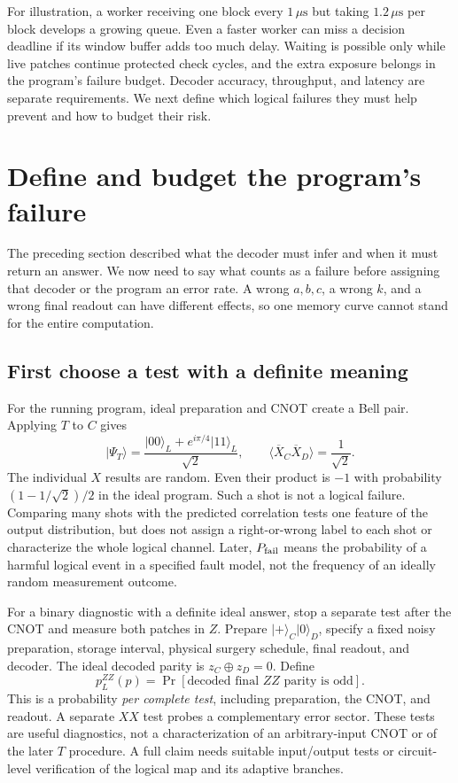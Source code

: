 \documentclass[11pt,a4paper]{article}
\newcommand{\ket}[1]{\lvert #1\rangle}
\newcommand{\XL}{\overline X}
\begin{document}
For illustration, a worker receiving one block every $1\,\mu\mathrm{s}$ but taking $1.2\,\mu\mathrm{s}$ per block develops a growing queue. Even a faster worker can miss a decision deadline if its window buffer adds too much delay. Waiting is possible only while live patches continue protected check cycles, and the extra exposure belongs in the program's failure budget. Decoder accuracy, throughput, and latency are separate requirements. We next define which logical failures they must help prevent and how to budget their risk.

\section{Define and budget the program's failure}\label{sec:budget}
The preceding section described what the decoder must infer and when it must return an answer. We now need to say what counts as a failure before assigning that decoder or the program an error rate. A wrong $a,b,c$, a wrong $k$, and a wrong final readout can have different effects, so one memory curve cannot stand for the entire computation.

\subsection{First choose a test with a definite meaning}
For the running program, ideal preparation and CNOT create a Bell pair. Applying $T$ to $C$ gives
\[
\ket{\Psi_T}=\frac{\ket{00}_L+e^{i\pi/4}\ket{11}_L}{\sqrt2},
\qquad \langle\XL_C\XL_D\rangle=\frac1{\sqrt2}.
\]
The individual $X$ results are random. Even their product is $-1$ with probability $(1-1/\sqrt2)/2$ in the ideal program. Such a shot is not a logical failure. Comparing many shots with the predicted correlation tests one feature of the output distribution, but does not assign a right-or-wrong label to each shot or characterize the whole logical channel. Later, $P_{\rm fail}$ means the probability of a harmful logical event in a specified fault model, not the frequency of an ideally random measurement outcome.

For a binary diagnostic with a definite ideal answer, stop a separate test after the CNOT and measure both patches in $Z$. Prepare $\ket+_C\ket0_D$, specify a fixed noisy preparation, storage interval, physical surgery schedule, final readout, and decoder. The ideal decoded parity is $z_C\oplus z_D=0$. Define
\begin{equation}\label{eq:pL}
p_L^{ZZ}(p)=\Pr[\text{decoded final }ZZ\text{ parity is odd}].
\end{equation}
This is a probability \emph{per complete test}, including preparation, the CNOT, and readout. A separate $XX$ test probes a complementary error sector. These tests are useful diagnostics, not a characterization of an arbitrary-input CNOT or of the later $T$ procedure. A full claim needs suitable input/output tests or circuit-level verification of the logical map and its adaptive branches.
\end{document}

